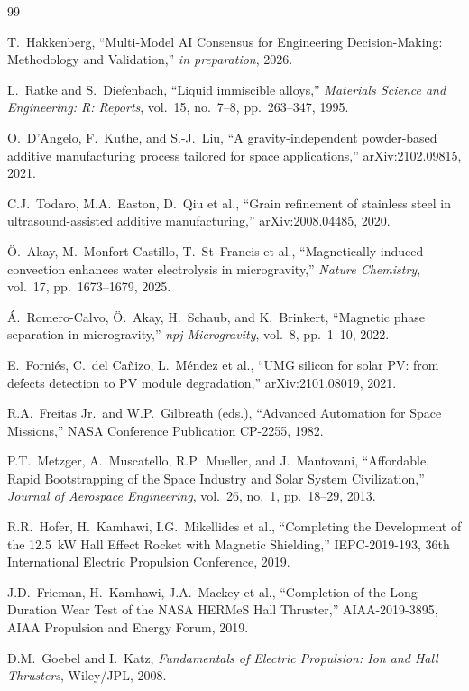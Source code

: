 \documentclass[preprint,12pt]{elsarticle}
\begin{document}

\begin{thebibliography}{99}

T.\ Hakkenberg, ``Multi-Model AI Consensus for Engineering Decision-Making: Methodology and Validation,'' \textit{in preparation}, 2026.

L.\ Ratke and S.\ Diefenbach, ``Liquid immiscible alloys,'' \textit{Materials Science and Engineering: R: Reports}, vol.~15, no.~7--8, pp.~263--347, 1995.

O.\ D'Angelo, F.\ Kuthe, and S.-J.\ Liu, ``A gravity-independent powder-based additive manufacturing process tailored for space applications,'' arXiv:2102.09815, 2021.

C.J.\ Todaro, M.A.\ Easton, D.\ Qiu et al., ``Grain refinement of stainless steel in ultrasound-assisted additive manufacturing,'' arXiv:2008.04485, 2020.

\"O.\ Akay, M.\ Monfort-Castillo, T.\ St~Francis et al., ``Magnetically induced convection enhances water electrolysis in microgravity,'' \textit{Nature Chemistry}, vol.~17, pp.~1673--1679, 2025.

\'A.\ Romero-Calvo, \"O.\ Akay, H.\ Schaub, and K.\ Brinkert, ``Magnetic phase separation in microgravity,'' \textit{npj Microgravity}, vol.~8, pp.~1--10, 2022.

E.\ Forni\'es, C.\ del Ca\~nizo, L.\ M\'endez et al., ``UMG silicon for solar PV: from defects detection to PV module degradation,'' arXiv:2101.08019, 2021.

R.A.\ Freitas Jr.\ and W.P.\ Gilbreath (eds.), ``Advanced Automation for Space Missions,'' NASA Conference Publication CP-2255, 1982.

P.T.\ Metzger, A.\ Muscatello, R.P.\ Mueller, and J.\ Mantovani, ``Affordable, Rapid Bootstrapping of the Space Industry and Solar System Civilization,'' \textit{Journal of Aerospace Engineering}, vol.~26, no.~1, pp.~18--29, 2013.

R.R.\ Hofer, H.\ Kamhawi, I.G.\ Mikellides et al., ``Completing the Development of the 12.5~kW Hall Effect Rocket with Magnetic Shielding,'' IEPC-2019-193, 36th International Electric Propulsion Conference, 2019.

J.D.\ Frieman, H.\ Kamhawi, J.A.\ Mackey et al., ``Completion of the Long Duration Wear Test of the NASA HERMeS Hall Thruster,'' AIAA-2019-3895, AIAA Propulsion and Energy Forum, 2019.

D.M.\ Goebel and I.\ Katz, \textit{Fundamentals of Electric Propulsion: Ion and Hall Thrusters}, Wiley/JPL, 2008.

\end{thebibliography}
\end{document}
